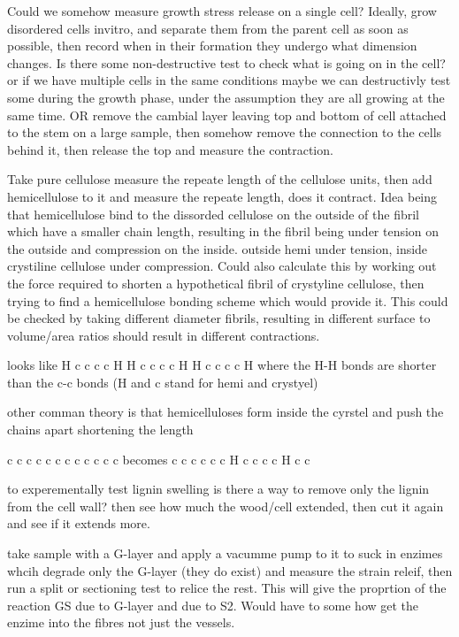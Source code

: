 \documentclass{article}
\begin{document}
Could we somehow measure growth stress release on a single cell?
Ideally, grow disordered cells invitro, and separate them from the parent cell
as soon as possible, then record when in their formation they undergo what
dimension changes. Is there some non-destructive test to check what is going on
in the cell? or if we have multiple cells in the same conditions maybe we can
destructivly test some during the growth phase, under the assumption they are all growing at the same time.
OR
remove the cambial layer leaving top and bottom of cell attached to the stem on a large sample,
then somehow remove the connection to the cells behind it, then release the top and measure the contraction.

Take pure cellulose measure the repeate length of the cellulose units, then add
hemicellulose to it and measure the repeate length, does it contract. Idea being
that hemicellulose bind to the dissorded cellulose on the outside of the fibril
which have a smaller chain length, resulting in the fibril being under tension
on the outside and compression on the inside. outside hemi under tension, inside
crystiline cellulose under compression. Could also calculate this by working out
the force required to shorten a hypothetical fibril of crystyline cellulose,
then trying to find a hemicellulose bonding scheme which would provide it.
This could be checked by taking different diameter fibrils, resulting in
different surface to volume/area ratios should result in different contractions.

looks like
H c c c c H
H c c c c H
H c c c c H
where the H-H bonds are shorter than the c-c bonds (H and c stand for hemi and
crystyel)

other comman theory is that hemicelluloses form inside the cyrstel and push the
chains apart shortening the length

c c c c
c c c c
c c c c
becomes
  c c c c
c c H c c
c c H c c

to experementally test lignin swelling is there a way to remove only the lignin
from the cell wall? then see how much the wood/cell extended, then cut it again
and see if it extends more.

take sample with a G-layer and apply a vacumme pump to it to suck in enzimes
whcih degrade only the G-layer (they do exist) and measure the strain releif,
then run a split or sectioning test to relice the rest. This will give the
proprtion of the reaction GS due to G-layer and due to S2. Would have to some
how get the enzime into the fibres not just the vessels.
\end{document}
